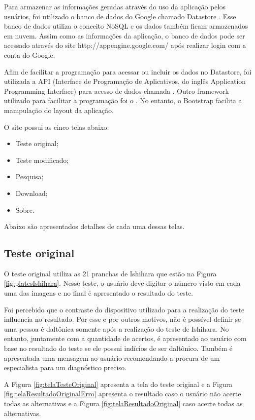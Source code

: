 \documentclass[	12pt, Times, openright, twoside, a4paper, english, brazil]{abntex2}
\begin{document}
Para armazenar as informações geradas através do uso da aplicação pelos usuários, foi utilizado o banco de dados do Google chamado Datastore \cite{googleclouddatastore}. Esse banco de dados utiliza o conceito NoSQL e os dados também ficam armazenados em nuvem. Assim como as informações da aplicação, o banco de dados pode ser acessado através do site http://appengine.google.com/ após realizar login com a conta do Google.

Afim de facilitar a programação para acessar ou incluir os dados no Datastore, foi utilizada a API (Interface de Programação de Aplicativos, do inglês Application Programming Interface) para acesso de dados chamada . Outro framework utilizado para facilitar a programação foi o . No entanto, o Bootstrap facilita a manipulação do layout da aplicação.

O site possui as cinco telas abaixo:

\begin{itemize}
\item Teste original;
\item Teste modificado;
\item Pesquisa;
\item Download;
\item Sobre.
\end{itemize}

Abaixo são apresentados detalhes de cada uma dessas telas.

\subsection{Teste original}
O teste original utiliza as 21 pranchas de Ishihara que estão na Figura \ref{fig:platesIshihara}. Nesse teste, o usuário deve digitar o número visto em cada uma das imagens e no final é apresentado o resultado do teste. 

Foi percebido que o contraste do dispositivo utilizado para a realização do teste influencia no resultado. Por esse e por outros motivos, não é possível definir se uma pessoa é daltônica somente após a realização do teste de Ishihara. No entanto, juntamente com a quantidade de acertos, é apresentado ao usuário com base no resultado do teste se ele possui indícios de ser daltônico. Também é apresentada uma mensagem ao usuário recomendando a procura de um especialista para um diagnóstico preciso.

A Figura \ref{fig:telaTesteOriginal} apresenta a tela do teste original e a Figura \ref{fig:telaResultadoOriginalErro} apresenta o resultado caso o usuário não acerte todas as alternativas e a Figura \ref{fig:telaResultadoOriginal} caso acerte todas as alternativas.
\end{document}
